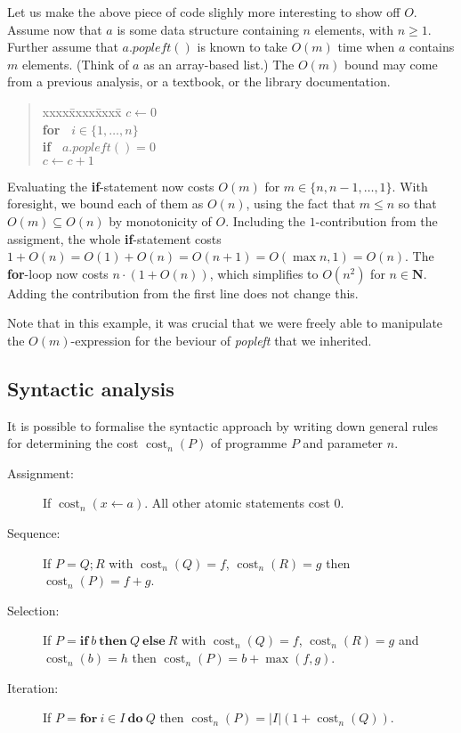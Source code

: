 \documentclass{tstextbook}
\begin{document}
\begin{example}
Let us make the above piece of code slighly more interesting to show off $O$.
Assume now that $a$ is some data structure containing $n$ elements, with $n\geq 1$.
Further assume that $a.\mathit{popleft}()$ is known to take $O(m)$ time when $a$ contains $m$ elements.
(Think of $a$ as an array-based list.)
The $O(m)$ bound may come from a previous analysis, or a textbook, or the library documentation.

\begin{quotation}
  \begin{tabbing}
    xxxx\=xxxx\=xxxx\=\kill
    $c \leftarrow{} 0$\\
    \textbf{for\ } $i\in \{1,\ldots,n\}$\\
    \> \textbf{if\ } $a.\mathit{popleft}() = 0$\\
    \>\> $c\leftarrow{} c + 1$\\
  \end{tabbing}
\end{quotation}

Evaluating the \textbf{if}-statement now costs $O(m)$ for $m\in \{n, n-1,\ldots, 1\}$.
With foresight, we bound each of them as $O(n)$, using the fact that $ m \leq n$ so that $O( m)\subseteq  O( n)$ by monotonicity of $O$.
Including the $1$-contribution from the assigment, the whole \textbf{if}-statement costs $1+O(n) = O(1) + O(n)= O(n + 1) = O(\max{n, 1})=  O(n)$.
The \textbf{for}-loop now costs $n \cdot (1 + O(n))$, which simplifies to $O(n^2)$ for $n\in \mathbf N$.
Adding the contribution from the first line does not change this.
\end{example}

Note that in this example, it was crucial that we were freely able to manipulate the $O(m)$-expression for the beviour of \emph{popleft} that we inherited.

\subsection{Syntactic analysis}

\newcommand{\cost}{\operatorname{cost}}

It is possible to formalise the syntactic approach by writing down general rules for determining the cost  $\cost_n(P)$ of programme $P$ and parameter $n$.

\begin{description}
  \item[Assignment:] If $\cost_n(x\leftarrow a)$. All other atomic statements cost $0$.
  \item[Sequence:] If $P = Q; R$ with $\cost_n(Q) =f$, $\cost_n(R)= g$ then $\cost_n(P)= f + g$.
  \item[Selection:] If $P = \mathbf{if\ } b \mathbf{\ then\ } Q \mathbf{\ else\ } R$ with $\cost_n(Q) =f$, $\cost_n(R)= g$ and $\cost_n(b)= h$ then $\cost_n(P) = b + \max (f, g)$.
  \item[Iteration:] If $P = \mathbf{for\ }i\in I \mathbf{\ do\ }  Q$ then $\cost_n(P) = |I|(1 + \cost_n(Q))$.
\end{description}
\end{document}
